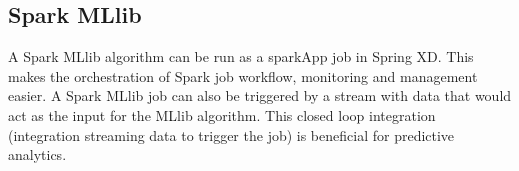 \subsection{Spark MLlib}
A Spark MLlib algorithm can be run as a sparkApp job in Spring XD. This makes the
orchestration of Spark job workflow, monitoring and management easier.
A Spark MLlib job can also be triggered by a stream with data that
would act as the input for the MLlib algorithm. This closed loop
integration (integration streaming data to trigger the job) is
beneficial for predictive analytics.
